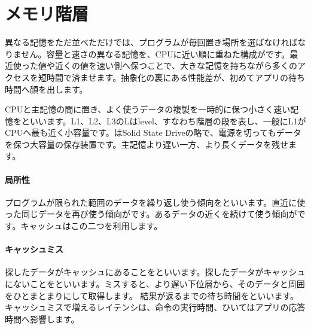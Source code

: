 \par
\endgroup
\par
\endgroup


\section{メモリ階層}
\label{sec:01-digital-computer-14}

異なる記憶をただ並べただけでは、プログラムが毎回置き場所を選ばなければなりません。容量と速さの異なる記憶を、CPUに近い順に重ねた構成がです。最近使った値や近くの値を速い側へ保つことで、大きな記憶を持ちながら多くのアクセスを短時間で済ませます。抽象化の裏にある性能差が、初めてアプリの待ち時間へ顔を出します。

CPUと主記憶の間に置き、よく使うデータの複製を一時的に保つ小さく速い記憶をといいます。L1、L2、L3のLはlevel、すなわち階層の段を表し、一般にL1がCPUへ最も近く小容量です。はSolid State Driveの略で、電源を切ってもデータを保つ大容量の保存装置です。主記憶より遅い一方、より長くデータを残せます。

\begingroup
  \centering
  \vspace{1mm}
\begingroup
\paragraph{局所性}
        プログラムが限られた範囲のデータを繰り返し使う傾向をといいます。直近に使った同じデータを再び使う傾向がです。あるデータの近くを続けて使う傾向がです。キャッシュはこの二つを利用します。

\par
\endgroup
\medskip
\begingroup
\paragraph{キャッシュミス}
        探したデータがキャッシュにあることをといいます。探したデータがキャッシュにないことをといいます。ミスすると、より遅い下位層から、そのデータと周囲をひとまとまりにして取得します。
        結果が返るまでの待ち時間をといいます。キャッシュミスで増えるレイテンシは、命令の実行時間、ひいてはアプリの応答時間へ影響します。

\par
\endgroup
\par
\endgroup


